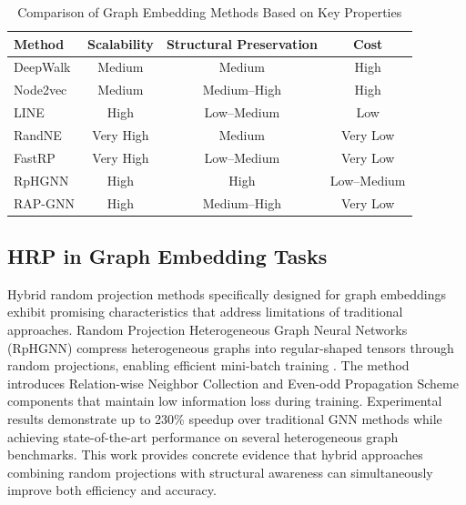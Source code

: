 \documentclass[conference]{IEEEtran}
\begin{document}
\begin{table}[ht]
\centering
\caption{Comparison of Graph Embedding Methods Based on Key Properties}
\label{tab:method_comparison}
\begin{tabular}{lccc}
\toprule 

\textbf{Method} & \textbf{Scalability} & \textbf{Structural Preservation} & \textbf{Cost} \\

\midrule 

DeepWalk & Medium & Medium & High \\
Node2vec & Medium & Medium--High & High \\
LINE & High & Low--Medium & Low \\
RandNE & Very High & Medium & Very Low \\
FastRP & Very High & Low--Medium & Very Low \\
RpHGNN & High & High & Low--Medium \\
RAP-GNN & High & Medium--High & Very Low \\

\bottomrule 
\end{tabular}
\end{table}


\subsection{HRP in Graph Embedding Tasks}

Hybrid random projection methods specifically designed for graph embeddings exhibit promising characteristics that address limitations of traditional approaches. Random Projection Heterogeneous Graph Neural Networks (RpHGNN) compress heterogeneous graphs into regular-shaped tensors through random projections, enabling efficient mini-batch training \cite{hu2021rphgnn}. The method introduces Relation-wise Neighbor Collection and Even-odd Propagation Scheme components that maintain low information loss during training. Experimental results demonstrate up to 230\% speedup over traditional GNN methods while achieving state-of-the-art performance on several heterogeneous graph benchmarks. This work provides concrete evidence that hybrid approaches combining random projections with structural awareness can simultaneously improve both efficiency and accuracy.
\end{document}
